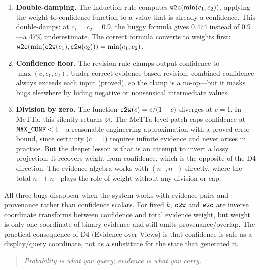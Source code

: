 \documentclass[11pt,openany]{report}
\begin{document}
\begin{enumerate}
\item \textbf{Double-damping.}  The induction rule computes
  $\texttt{w2c}(\min(c_1, c_2))$, applying the
  weight-to-confidence function to a value that is already a
  confidence.  This double-damps: at $c_1 = c_2 = 0.9$, the
  buggy formula gives $0.474$ instead of $0.9$---a 47\%
  underestimate.  The correct formula converts to weights first:
  $\texttt{w2c}(\min(\texttt{c2w}(c_1), \texttt{c2w}(c_2))) =
  \min(c_1, c_2)$.

\item \textbf{Confidence floor.}  The revision rule clamps
  output confidence to $\max(c, c_1, c_2)$.  Under correct
  evidence-based revision, combined confidence always exceeds
  each input (proved), so the clamp is a no-op---but it masks
  bugs elsewhere by hiding negative or nonsensical intermediate
  values.

\item \textbf{Division by zero.}  The function
  $\texttt{c2w}(c) = c/(1-c)$ diverges at $c = 1$.  In MeTTa,
  this silently returns $\varnothing$.  The MeTTa-level patch
  caps confidence at $\texttt{MAX\_CONF} < 1$---a reasonable
  engineering approximation with a proved error bound, since
  certainty ($c = 1$) requires infinite evidence and never
  arises in practice.  But the deeper lesson is that
   is an attempt to invert a lossy projection:
  it recovers weight from confidence, which is the opposite
  of the D4 direction.  The evidence algebra works with
  $(n^+, n^-)$ directly, where the total $n^+ + n^-$
  plays the role of weight without any division or cap.
\end{enumerate}

\noindent
All three bugs disappear when the system works with evidence
pairs and provenance rather than confidence scalars.  For fixed $k$,
$\texttt{c2w}$ and $\texttt{w2c}$ are inverse coordinate transforms between
confidence and total evidence weight, but weight is only one coordinate
of binary evidence and still omits provenance/overlap.  The practical
consequence of D4 (Evidence over Views) is that confidence is safe as a
display/query coordinate, not as a substitute for the state that
generated it.

\begin{quote}
\emph{Probability is what you query; evidence is what you carry.}
\end{quote}

\end{document}
